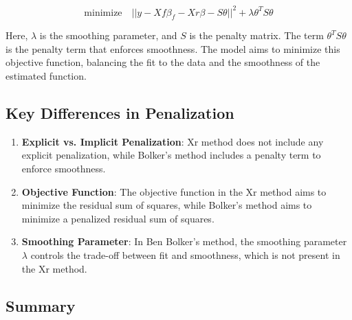 \begin{equation}
\text{minimize} \quad ||y - Xf \beta_f - Xr \beta - S \theta||^2 + \lambda \theta^T S \theta
\end{equation}

Here, \(\lambda\) is the smoothing parameter, and \(S\) is the penalty matrix. The term \(\theta^T S \theta\) is the penalty term that enforces smoothness. The model aims to minimize this objective function, balancing the fit to the data and the smoothness of the estimated function.

\subsection{Key Differences in Penalization}

\begin{enumerate}
    \item \textbf{Explicit vs. Implicit Penalization}: Xr method does not include any explicit penalization, while Bolker's method includes a penalty term to enforce smoothness.
    
    \item \textbf{Objective Function}: The objective function in the Xr method aims to minimize the residual sum of squares, while Bolker's method aims to minimize a penalized residual sum of squares.
    
    \item \textbf{Smoothing Parameter}: In Ben Bolker's method, the smoothing parameter \(\lambda\) controls the trade-off between fit and smoothness, which is not present in the Xr method.
\end{enumerate}

\subsection{Summary}



